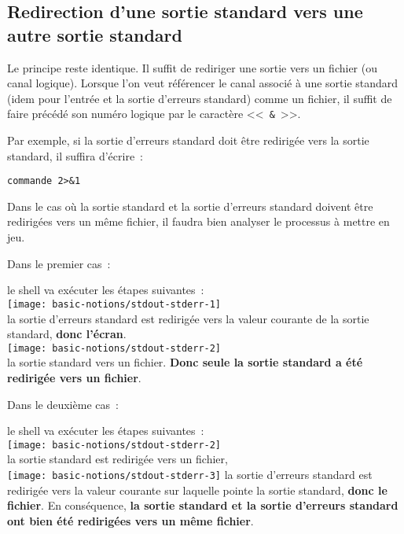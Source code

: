 \begin{remarque}
\subsection{Redirection d'une sortie standard vers une autre sortie standard}

Le principe reste identique. Il suffit de rediriger une sortie vers un
fichier (ou canal logique). Lorsque l'on veut r{\'e}f{\'e}rencer le canal
associ{\'e} {\`a} une sortie standard (idem pour l'entr{\'e}e et la sortie d'erreurs
standard) comme un fichier, il suffit de faire pr{\'e}c{\'e}d{\'e} son num{\'e}ro
logique par le caract{\`e}re <<~\texttt{\&}~>>.

Par exemple, si la sortie d'erreurs standard doit {\^e}tre redirig{\'e}e vers la
sortie standard, il
suffira d'{\'e}crire~:
\begin{verbatim}
commande 2>&1
\end{verbatim}

Dans le cas o{\`u} la sortie standard et la sortie d'erreurs standard doivent {\^e}tre redirig{\'e}es
vers un m{\^e}me fichier, il faudra bien analyser le processus {\`a} mettre en jeu.

Dans le premier cas~:
\begin{center}
\end{center}
le shell va ex{\'e}cuter les {\'e}tapes suivantes~:\\[0.5cm]
\texttt{[image: basic-notions/stdout-stderr-1]}	\\
la sortie d'erreurs standard est redirig{\'e}e vers la valeur courante de la sortie
standard, {\bf donc l'{\'e}cran}.\\[0.5cm]
\texttt{[image: basic-notions/stdout-stderr-2]} \\
la sortie standard vers un fichier. {\bf Donc seule la sortie standard a
{\'e}t{\'e} redirig{\'e}e vers un fichier}.

Dans le deuxi{\`e}me cas~:
\begin{center}
\end{center}
le shell va ex{\'e}cuter les {\'e}tapes suivantes~:\\[0.5cm]
	\texttt{[image: basic-notions/stdout-stderr-2]}	\\
la sortie standard est redirig{\'e}e vers un fichier,\\[0.5cm]
	\texttt{[image: basic-notions/stdout-stderr-3]}
la sortie d'erreurs standard est redirig{\'e}e vers la valeur courante sur laquelle
pointe la sortie standard, {\bf donc le fichier}. En cons{\'e}quence,
{\bf la sortie standard et la sortie d'erreurs standard ont bien {\'e}t{\'e} redirig{\'e}es vers un
m{\^e}me fichier}.


\end{remarque}
